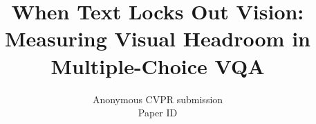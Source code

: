 \documentclass[10pt,twocolumn,letterpaper]{article}
\title{When Text Locks Out Vision: Measuring Visual Headroom in Multiple-Choice VQA}
\author{Anonymous CVPR submission\\
Paper ID \paperID}
\begin{document}
\maketitle










{
    \small
    
    
}
\end{document}
